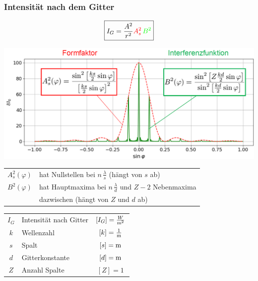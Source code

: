 \subsubsection{Intensität nach dem Gitter}

$$ \boxed{ I_G = \frac{A^2}{r^2} \textcolor{red}{A_s^2} \, \textcolor{green}{B^2} }$$




\includegraphics[width=0.9\linewidth]{Bilder/Wellen-Optik/beugung_gitter_intensitaet} \\
\vspace{0.2cm} 
\renewcommand{\arraystretch}{1.2}
\begin{tabular}{ll}
$A_s^2(\varphi)$ & hat Nullstellen bei $n \, \frac{\lambda}{s}$ (hängt von $s$ ab) \\
$B^2(\varphi)$ & hat Hauptmaxima bei $n \, \frac{\lambda}{d}$ und $Z - 2$ Nebenmaxima\\
& dazwischen (hängt von $Z$ und $d$ ab)\\
\end{tabular}
\renewcommand{\arraystretch}{1}


\vspace{0.2cm}

\renewcommand{\arraystretch}{1.3}
\begin{tabular}{clc}
$I_G$ & Intensität nach Gitter & $[I_G] = \frac{W}{\mathrm{m}^2}$ \\
$k$ & Wellenzahl & $[k] = \frac{1}{\mathrm{m}}$ \\
$s$ & Spalt & $[s] = \mathrm{m}$ \\
$d$ & Gitterkonstante & $[d] = \mathrm{m}$ \\
$Z$ & Anzahl Spalte & $[Z] = 1$
\end{tabular}
\renewcommand{\arraystretch}{1}

